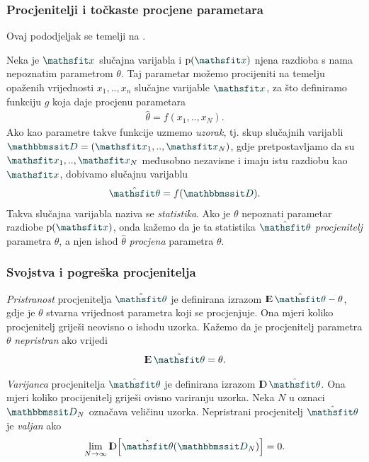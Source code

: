 \documentclass[utf8, diplomski, lmodern]{fer}
\begin{document}
\subsubsection{Procjenitelji i točkaste procjene parametara}

Ovaj pododjeljak se temelji na \citet{Elezovic:2007:VSSV}.

Neka je $\rvar x$ slučajna varijabla i $\p(\rvar x)$ njena razdioba s nama nepoznatim parametrom $\theta$. Taj parametar možemo procijeniti na temelju opaženih vrijednosti $x_1,..,x_n$ slučajne varijable $\rvar x$, za što definiramo funkciju $g$ koja daje procjenu parametara
\begin{align}
\hat{\theta}=f(x_1,..,x_N) \text{.}
\end{align}
Ako kao parametre takve funkcije uzmemo \emph{uzorak}, tj. skup slučajnih varijabli $\rset D=\del{\rvar x_1,..,\rvar x_N}$, gdje pretpostavljamo da su $\rvar x_1,..,\rvar x_N$ međusobno nezavisne i imaju istu razdiobu kao $\rvar x$, dobivamo slučajnu varijablu
\begin{align}
\hat{\rvar\theta}=f(\rset D) \text{.}
\end{align}
Takva slučajna varijabla naziva se \emph{statistika}. Ako je $\theta$ nepoznati parametar razdiobe $\p(\rvar x)$, onda kažemo da je ta statistika $\hat{\rvar\theta}$ \emph{procjenitelj} parametra $\theta$, a njen ishod $\hat{\theta}$ \emph{procjena} parametra $\theta$.

\subsubsection{Svojstva i pogreška procjenitelja}

\emph{Pristranost} procjenitelja $\hat{\rvar\theta}$ je definirana izrazom $\E\hat{\rvar\theta} - \theta$, gdje je $\theta$ stvarna vrijednost parametra koji se procjenjuje. Ona mjeri koliko procjenitelj griješi neovisno o ishodu uzorka. Kažemo da je procjenitelj parametra $\theta$ \emph{nepristran} ako vrijedi
\begin{align}
\E\hat{\rvar\theta} = \theta \text{.}
\end{align}

\emph{Varijanca} procjenitelja $\hat{\rvar\theta}$ je definirana izrazom $\D\hat{\rvar\theta}$. Ona mjeri koliko procijenitelj griješi ovisno variranju uzorka. 
Neka $N$ u oznaci ${\rset D}_N$ označava veličinu uzorka. Nepristrani procjenitelj $\hat{\rvar\theta}$ je \emph{valjan} ako 
\begin{align}
\lim_{N\to\infty} \D\sbr{\hat{\rvar\theta}(\rset D_N)} = 0  \text{.}
\end{align}
\end{document}
